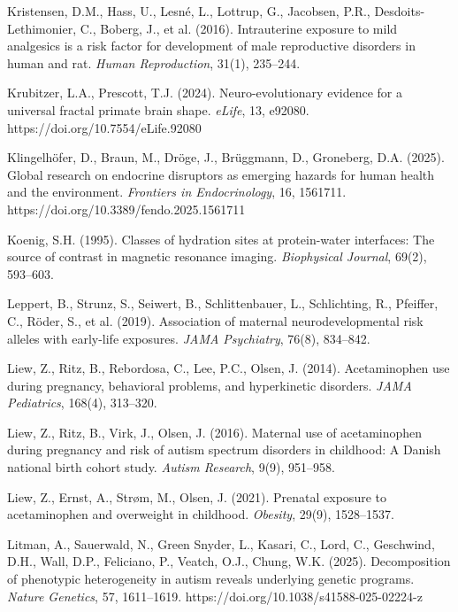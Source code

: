 \documentclass[11pt]{article}
\begin{document}
\begin{thebibliography}{99}
Kristensen, D.M., Hass, U., Lesné, L., Lottrup, G., Jacobsen, P.R., Desdoits-Lethimonier, C., Boberg, J., et al. (2016).
Intrauterine exposure to mild analgesics is a risk factor for development of male reproductive disorders in human and rat.
\textit{Human Reproduction}, 31(1), 235--244.

Krubitzer, L.A., Prescott, T.J. (2024).
Neuro-evolutionary evidence for a universal fractal primate brain shape.
\textit{eLife}, 13, e92080.
https://doi.org/10.7554/eLife.92080

Klingelhöfer, D., Braun, M., Dröge, J., Brüggmann, D., Groneberg, D.A. (2025).
Global research on endocrine disruptors as emerging hazards for human health and the environment.
\textit{Frontiers in Endocrinology}, 16, 1561711.
https://doi.org/10.3389/fendo.2025.1561711

Koenig, S.H. (1995).
Classes of hydration sites at protein-water interfaces: The source of contrast in magnetic resonance imaging.
\textit{Biophysical Journal}, 69(2), 593--603.

Leppert, B., Strunz, S., Seiwert, B., Schlittenbauer, L., Schlichting, R., Pfeiffer, C., Röder, S., et al. (2019).
Association of maternal neurodevelopmental risk alleles with early-life exposures.
\textit{JAMA Psychiatry}, 76(8), 834--842.

Liew, Z., Ritz, B., Rebordosa, C., Lee, P.C., Olsen, J. (2014).
Acetaminophen use during pregnancy, behavioral problems, and hyperkinetic disorders.
\textit{JAMA Pediatrics}, 168(4), 313--320.

Liew, Z., Ritz, B., Virk, J., Olsen, J. (2016).
Maternal use of acetaminophen during pregnancy and risk of autism spectrum disorders in childhood: A Danish national birth cohort study.
\textit{Autism Research}, 9(9), 951--958.

Liew, Z., Ernst, A., Strøm, M., Olsen, J. (2021).
Prenatal exposure to acetaminophen and overweight in childhood.
\textit{Obesity}, 29(9), 1528--1537.

Litman, A., Sauerwald, N., Green Snyder, L., Kasari, C., Lord, C., Geschwind, D.H., Wall, D.P., Feliciano, P., Veatch, O.J., Chung, W.K. (2025).
Decomposition of phenotypic heterogeneity in autism reveals underlying genetic programs.
\textit{Nature Genetics}, 57, 1611--1619.
https://doi.org/10.1038/s41588-025-02224-z


\end{thebibliography}
\end{document}
